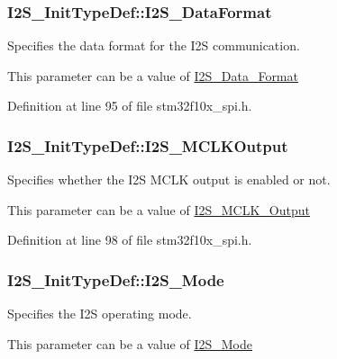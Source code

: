 \hypertarget{struct_i2_s___init_type_def_ad5e59034081427fd638983c10f18e833}{
\subsubsection[{I2\-S\-\_\-\-Data\-Format}]{ I2\-S\-\_\-\-Init\-Type\-Def\-::\-I2\-S\-\_\-\-Data\-Format}}\label{struct_i2_s___init_type_def_ad5e59034081427fd638983c10f18e833}
\begin{DoxyVerb}   Specifies the data format for the I2S communication.
\end{DoxyVerb}
 This parameter can be a value of \hyperlink{group___i2_s___data___format}{I2\-S\-\_\-\-Data\-\_\-\-Format} 

Definition at line 95 of file stm32f10x\-\_\-spi.\-h.

\hypertarget{struct_i2_s___init_type_def_ae7aaf79b7f392d79ac2f7b35a24e5d1a}{
\subsubsection[{I2\-S\-\_\-\-M\-C\-L\-K\-Output}]{ I2\-S\-\_\-\-Init\-Type\-Def\-::\-I2\-S\-\_\-\-M\-C\-L\-K\-Output}}\label{struct_i2_s___init_type_def_ae7aaf79b7f392d79ac2f7b35a24e5d1a}
\begin{DoxyVerb}   Specifies whether the I2S MCLK output is enabled or not.
\end{DoxyVerb}
 This parameter can be a value of \hyperlink{group___i2_s___m_c_l_k___output}{I2\-S\-\_\-\-M\-C\-L\-K\-\_\-\-Output} 

Definition at line 98 of file stm32f10x\-\_\-spi.\-h.

\hypertarget{struct_i2_s___init_type_def_aa57e5190eac245c0873a00849b1bd239}{
\subsubsection[{I2\-S\-\_\-\-Mode}]{ I2\-S\-\_\-\-Init\-Type\-Def\-::\-I2\-S\-\_\-\-Mode}}\label{struct_i2_s___init_type_def_aa57e5190eac245c0873a00849b1bd239}
\begin{DoxyVerb}         Specifies the I2S operating mode.
\end{DoxyVerb}
 This parameter can be a value of \hyperlink{group___i2_s___mode}{I2\-S\-\_\-\-Mode} 

